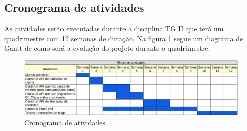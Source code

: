 \documentclass[12pt]{article}
\begin{document}
\subsection{Cronograma de atividades}

As atividades serão executadas durante a disciplina TG II que terá um quadrimestre com 12 semanas de duração. Na figura \ref{fig:cronograma} segue um diagrama de Gantt de como será a evolução do projeto durante o quadrimestre.

\begin{figure}[H]
    \centering
    \includegraphics[scale=0.4]{Imagens/cronograma.png}
    \caption{Cronograma de atividades.}
    \label{fig:cronograma}
\end{figure}


\singlespacing
\newpage
\printbibliography
\end{document}
